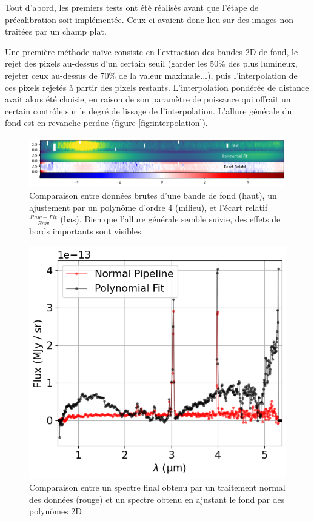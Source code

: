 \documentclass[11pt, a4paper]{article}
\begin{document}
Tout d'abord, les premiers tests ont été réalisés avant que l'étape de précalibration soit implémentée. Ceux ci avaient donc lieu sur des images non traitées par un champ plat.

Une première méthode naïve consiste en l'extraction des bandes 2D de fond, le rejet des pixels au-dessus d'un certain seuil (garder les 50\% des plus lumineux, rejeter ceux au-dessus de 70\% de la valeur maximale...), puis l'interpolation de ces pixels rejetés à partir des pixels restants. L'interpolation pondérée de distance avait alors été choisie, en raison de son paramètre de puissance qui offrait un certain contrôle sur le degré de lissage de l'interpolation. L'allure générale du fond est en revanche perdue (figure \ref{fig:interpolation}).\\

\begin{figure}[H]
  \centering
  \includegraphics[scale=0.7]{assets/2D_polynomial.png}
  \caption{Comparaison entre données brutes d'une bande de fond (haut), un ajustement par un polynôme d'ordre 4 (milieu), et l'écart relatif $\frac{Raw - Fit}{Raw}$ (bas). Bien que l'allure générale semble suivie, des effets de bords importants sont visibles.}
  \label{fig:2D_polynomial}
\end{figure}

\begin{figure}
  \centering
  \includegraphics[scale=0.5]{assets/comparaison_normal_fit.png}
  \caption{Comparaison entre un spectre final obtenu par un traitement normal des données (rouge) et un spectre obtenu en ajustant le fond par des polynômes 2D}
  \label{fig:comparaison_fit_normal}
\end{figure}
\end{document}
